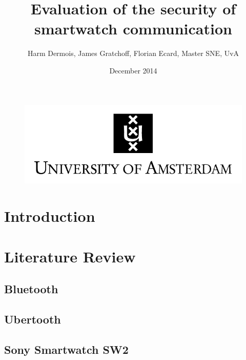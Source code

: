 \documentclass{article}
\begin{document}
 



\begin{figure}[!h]
 	\begin{center}
		\huge \title{Evaluation of the security of smartwatch communication}
		\author{Harm Dermois, James Gratchoff, Florian Ecard,  Master SNE, UvA} 
		\date{December 2014\\}
	\maketitle 
		\includegraphics{uva.jpeg}
		\label{sec:uva}
	\end{center}
\end{figure}

\newpage

\tableofcontents

\newpage

\newcommand{\pend}{
 \\ 
\indent}

\section{Introduction}
\section{Literature Review}

	\subsection{Bluetooth}
	\subsection{Ubertooth}
	\subsection{Sony Smartwatch SW2} %
	
\newpage
\end{document}
